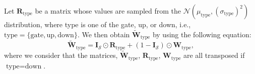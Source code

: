 %
Let ${\mathbf{R}}_{\text{type}}$ be a matrix whose values are sampled from the $\mathcal{N}( \mu_{\text{type}}, ( \sigma_{\text{type}} )^2 )$ distribution, where type is one of the gate, up, or down, i.e., $\text{type} =\{\text{gate},\text{up},\text{down}\}$.
%
We then obtain $\widetilde{\mathbf{W}}_{\text{type}}$ by using the following equation:
\begin{equation}
\widetilde{\mathbf{W}}_{\text{type}} = \mathbf{I}_{\mathcal{S}} \odot \mathbf{R}_{\text{type}} +  (1 - \mathbf{I}_{\mathcal{S}}) \odot \mathbf{W}_{\text{type}}
,
\label{eq:DU_rand_init}
\end{equation}
where we consider that the matrices, $\widetilde{\mathbf{W}}_{\text{type}}$, ${\mathbf{R}}_{\text{type}}$, ${\mathbf{W}}_{\text{type}}$ are all transposed if $\text{type} = \text{down}$. 


